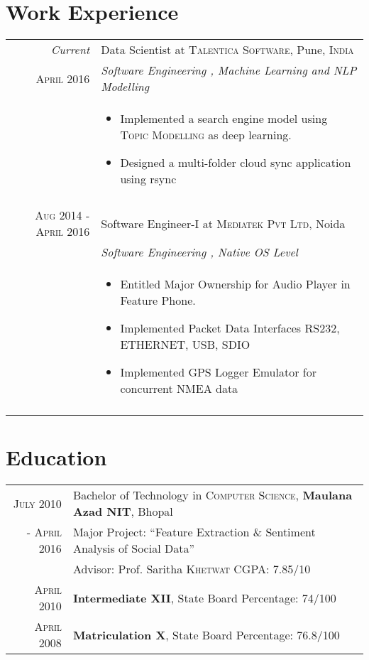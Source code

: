 \documentclass[a4paper,10pt]{article}
\begin{document}
\section{Work Experience}
\begin{tabular}{r|p{13cm}}
 \emph{Current} & Data Scientist at \textsc{Talentica Software}, Pune, \textsc{India} \\\textsc{April 2016}&\emph{Software Engineering , Machine Learning and NLP Modelling}\\&\footnotesize
\begin{itemize}
\item Implemented a search engine model using \textsc{Topic Modelling} as deep learning.
\item Designed a multi-folder cloud sync application using rsync
\end{itemize}\\
\multicolumn{2}{c}{} \\
 \textsc{Aug 2014 - April 2016} & Software Engineer-I at \textsc{Mediatek Pvt Ltd}, Noida \\&\emph{Software Engineering , Native OS Level}\\&\footnotesize
 \begin{itemize}
\item Entitled Major Ownership for Audio Player in Feature Phone.
\item Implemented Packet Data Interfaces \textsc{RS232, ETHERNET, USB, SDIO}
\item Implemented GPS Logger Emulator for concurrent \textsc{NMEA} data
\end{itemize} \\
\multicolumn{2}{c}{}
\end{tabular}

\section{Education}
\begin{tabular}{rl}	
 \textsc{July} 2010 & Bachelor of Technology in \textsc{Computer Science}, \textbf{Maulana Azad NIT}, Bhopal\\\textsc{- April 2016}
& Major Project: ``Feature Extraction \& Sentiment Analysis
of Social Data'' \\ 
& \small Advisor: Prof. Saritha \textsc{Khetwat}
{\hfill CGPA: 7.85/10} \\

\textsc{April} 2010& \textbf{Intermediate XII}, State Board {\hfill Percentage: 74/100} \\

\textsc{April} 2008& \textbf{Matriculation X}, State Board {\hfill Percentage: 76.8/100} \\
\end{tabular}
\break
\end{document}
